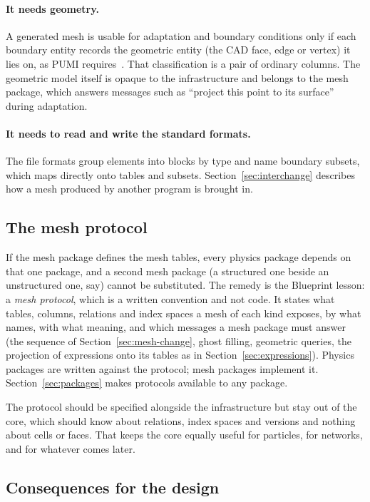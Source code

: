 \documentclass[11pt,a4paper]{article}
\begin{document}
\paragraph{It needs geometry.}  A generated mesh is usable for adaptation
and boundary conditions only if each boundary entity records the geometric
entity (the CAD face, edge or vertex) it lies on, as PUMI
requires~\cite{pumi}.  That classification is a pair of ordinary columns.
The geometric model itself is opaque to the infrastructure and belongs to
the mesh package, which answers messages such as \enquote{project this point
to its surface} during adaptation.

\paragraph{It needs to read and write the standard formats.}  The file
formats group elements into blocks by type and name boundary subsets, which
maps directly onto tables and subsets.  Section~\ref{sec:interchange}
describes how a mesh produced by another program is brought in.

\subsection{The mesh protocol}
\label{sec:mesh-protocol}

If the mesh package defines the mesh tables, every physics package depends on
that one package, and a second mesh package (a structured one beside an
unstructured one, say) cannot be substituted.  The remedy is the Blueprint
lesson: a \emph{mesh protocol}, which is a written convention and not code.
It states what tables, columns, relations and index spaces a mesh of each
kind exposes, by what names, with what meaning, and which messages a mesh
package must answer (the sequence of Section~\ref{sec:mesh-change}, ghost
filling, geometric queries, the projection of expressions onto its tables as
in Section~\ref{sec:expressions}).  Physics packages are written against the
protocol; mesh packages implement it.  Section~\ref{sec:packages} makes
protocols available to any package.

The protocol should be specified alongside the infrastructure but stay out of
the core, which should know about relations, index spaces and versions and
nothing about cells or faces.  That keeps the core equally useful for
particles, for networks, and for whatever comes later.

\subsection{Consequences for the design}
\end{document}
